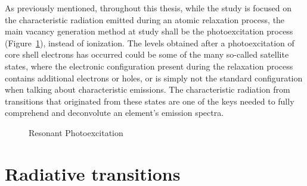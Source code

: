 As previously mentioned, throughout this thesis, while the study is focused on the characteristic radiation emitted during an atomic relaxation process, the main vacancy generation method at study shall be the photoexcitation process (Figure~\ref{fig:exc}), instead of ionization. The levels obtained after a photoexcitation of core shell electrons has occurred could be some of the many so-called satellite states, where the electronic configuration present during the relaxation process contains additional electrons or holes, or is simply not the standard configuration when talking about characteristic emissions.
The characteristic radiation from transitions that originated from these states are one of the keys needed to fully comprehend and deconvolute an element's emission spectra.


\begin{figure}[h!]
    \centering
    \caption{Resonant Photoexcitation}\label{fig:exc}
\end{figure}

\section{Radiative transitions}



